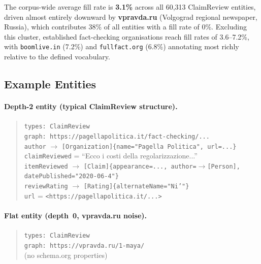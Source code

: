 \documentclass[11pt,a4paper]{article}
\begin{document}
The corpus-wide average fill rate is \textbf{3.1\%} across all 60{,}313
ClaimReview entities, driven almost entirely downward by \textbf{vpravda.ru}
(Volgograd regional newspaper, Russia), which contributes 38\% of all entities
with a fill rate of 0\%.
Excluding this cluster, established fact-checking organisations reach fill
rates of 3.6--7.2\%, with \texttt{boomlive.in} (7.2\%) and
\texttt{fullfact.org} (6.8\%) annotating most richly relative to the
defined vocabulary.


\subsection{Example Entities}

\paragraph{Depth-2 entity (typical ClaimReview structure).}
\begin{quote}\small
\texttt{types: ClaimReview}\\
\texttt{graph: https://pagellapolitica.it/fact-checking/...}\\
\texttt{author} $\to$ \texttt{[Organization]\{name="Pagella Politica", url=...\}}\\
\texttt{claimReviewed} = ``Ecco i costi della regolarizzazione...''\\
\texttt{itemReviewed} $\to$ \texttt{[Claim]\{appearance=..., author=$\to$[Person], datePublished="2020-06-4"\}}\\
\texttt{reviewRating} $\to$ \texttt{[Rating]\{alternateName="Ni'"\}}\\
\texttt{url} = \texttt{<https://pagellapolitica.it/...>}
\end{quote}

\paragraph{Flat entity (depth~0, vpravda.ru noise).}
\begin{quote}\small
\texttt{types: ClaimReview}\\
\texttt{graph: https://vpravda.ru/1-maya/}\\
(no schema.org properties)
\end{quote}

\end{document}
